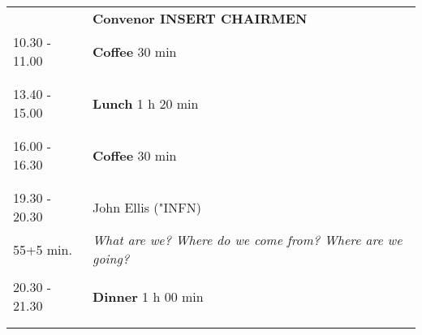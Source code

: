 \begin{longtable}{p{3cm}p{13cm}}
&\hfill {\bf Convenor INSERT CHAIRMEN }\\ 
10.30 - 11.00 & {\bf Coffee} \hfill 30 min \\ 
 & \\ 
 & \\ 
13.40 - 15.00 & {\bf Lunch} \hfill 1 h 20 min \\ 
 & \\ 
 & \\ 
16.00 - 16.30 & {\bf Coffee} \hfill 30 min \\ 
 & \\ 
 & \\ 
19.30 - 20.30 & John Ellis ("INFN)\\ 
55+5 min. & {\it What are we? Where do we come from? Where are we going?}\\ 
 & \\ 
20.30 - 21.30 & {\bf Dinner} \hfill 1 h 00 min \\ 
 & \\ 
 & \\ 
\end{longtable}

